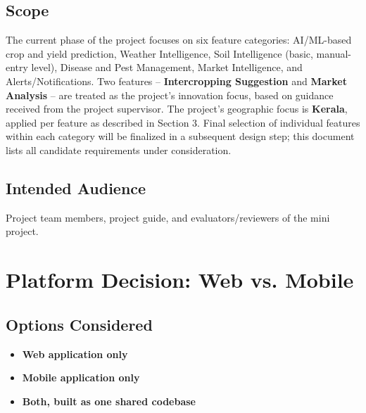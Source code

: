 \documentclass[12pt,a4paper]{article}
\begin{document}
\subsection{Scope}
The current phase of the project focuses on six feature categories: AI/ML-based crop and yield prediction, Weather Intelligence, Soil Intelligence (basic, manual-entry level), Disease and Pest Management, Market Intelligence, and Alerts/Notifications. Two features -- \textbf{Intercropping Suggestion} and \textbf{Market Analysis} -- are treated as the project's innovation focus, based on guidance received from the project supervisor. The project's geographic focus is \textbf{Kerala}, applied per feature as described in Section 3. Final selection of individual features within each category will be finalized in a subsequent design step; this document lists all candidate requirements under consideration.

\subsection{Intended Audience}
Project team members, project guide, and evaluators/reviewers of the mini project.

\section{Platform Decision: Web vs. Mobile}

\subsection{Options Considered}
\begin{itemize}[leftmargin=*]
    \item \textbf{Web application only}
    \item \textbf{Mobile application only}
    \item \textbf{Both, built as one shared codebase}
\end{itemize}
\end{document}
